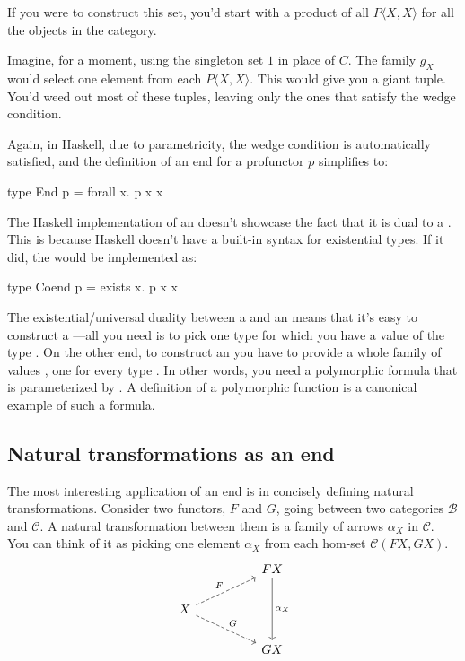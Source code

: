 \documentclass[DaoFP]{subfiles}
\begin{document}
If you were to construct this set, you'd start with a product of all $P \langle X, X \rangle$ for all the objects in the category. 

Imagine, for a moment, using the singleton set $1$ in place of $C$. The family $g_X$ would select one element from each $P \langle X, X \rangle$. This would give you a giant tuple. You'd weed out most of these tuples, leaving only the ones that satisfy the wedge condition. 

Again, in Haskell, due to parametricity, the wedge condition is automatically satisfied, and the definition of an end for a profunctor $p$ simplifies to:

\begin{haskell}
type End p = forall x. p x x
\end{haskell}

The Haskell implementation of an  doesn't showcase the fact that it is dual to a . This is because Haskell doesn't have a built-in syntax for existential types. If it did, the  would be implemented as:
\begin{haskell}
type Coend p = exists x. p x x
\end{haskell}

The existential/universal duality between a  and an  means that it's easy to construct a ---all you need is to pick one type  for which you have a value of the type . On the other end, to construct an  you have to provide a whole family of values , one for every type . In other words, you need a polymorphic formula that is parameterized by . A definition of a polymorphic function is a canonical example of such a formula.


\subsection{Natural transformations as an end}

The most interesting application of an end is in concisely defining natural transformations. Consider two functors, $F$ and $G$, going between two categories  $\mathcal{B}$ and $\mathcal{C}$. A natural transformation between them is a family of arrows $\alpha_X$ in $\mathcal{C}$. You can think of it as picking one element $\alpha_X$ from each hom-set  $\mathcal{C} (F X, G X)$.
\[
 \begin{tikzcd}
 && F X
 \arrow[dd, "\alpha_X"]
 \\
 X
 \arrow[urr, dashed, "F"]
 \arrow[drr, dashed, "G"]
 \\
 && G X
 \end{tikzcd}
\]
\end{document}
